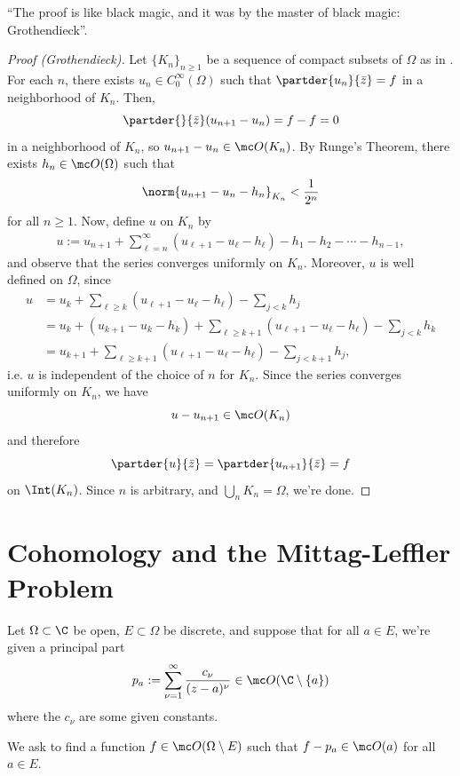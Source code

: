 \documentclass[11pt]{report}
\begin{document}
``The proof is like black magic, and it was by the master of black magic: Grothendieck''.

\begin{proof}[Proof (Grothendieck)]
Let $\{K_n\}_{n \geq1}$ be a sequence of compact subsets of $\Omega$ as in . For each $n$, there exists $u_n \in C_0^\infty (\Omega)$ such that $\partder{u_n}{\bar z}=f$ in a neighborhood of $K_n$. Then,
$$\partder{}{\bar z}(u_{n+1}-u_n)=f-f=0$$
in a neighborhood of $K_n$, so $u_{n+1}-u_n \in \mc O(K_n)$. By Runge's Theorem, there exists $h_n \in \mc O(\Omega)$ such that
$$\norm{u_{n+1}-u_n-h_n}_{K_n} < \frac{1}{2^n}$$
for all $n \geq 1$. Now, define $u$ on $K_n$ by
\begin{align} \label{eq:def-of-u}
    u:=u_{n+1}+\sum_{\ell = n}^\infty (u_{\ell+1}-u_{\ell}-h_{\ell})-h_1-h_2-\cdots- h_{n-1},
\end{align}
and observe that the series converges uniformly on $K_n$. Moreover, $u$ is well defined on $\Omega$, since
\begin{align*}
    u&=u_k + \sum_{\ell \geq k}(u_{\ell+1}-u_{\ell}-h_\ell)-\sum_{j<k}h_j
    \\ &= u_k+(u_{k+1}-u_k-h_k)+\sum_{\ell \geq k+1}(u_{\ell+1}-u_{\ell}-h_{\ell})-\sum_{j < k}h_k
    \\ &= u_{k+1}+\sum_{\ell \geq k+1}(u_{\ell+1}-u_\ell -h_\ell) - \sum_{j < k+1}h_j,
\end{align*}
i.e. $u$ is independent of the choice of $n$ for $K_n$. Since the series converges uniformly on $K_n$, we have
$$u-u_{n+1}\in \mc O(K_n)$$
and therefore
$$\partder{u}{\bar z}=\partder{u_{n+1}}{\bar z}=f$$
on $\Int(K_n)$. Since $n$ is arbitrary, and $\bigcup_{n}K_n = \Omega$, we're done.
\end{proof}

\section{Cohomology and the Mittag-Leffler Problem}

\begin{notebox}
   Let $\Omega \subset \C$ be open, $E \subset \Omega$ be discrete, and suppose that for all $a \in E$, we're given a principal part
$$p_a:=\sum_{\nu=1}^\infty \frac{c_\nu}{(z-a)^\nu} \in \mc O(\C \setminus \{a\})$$
where the $c_\nu$ are some given constants.

We ask to find a function $f\in \mc O(\Omega \setminus E)$ such that $f - p_a \in \mc O(a)$ for all $a \in E$.
\end{notebox}
\end{document}
